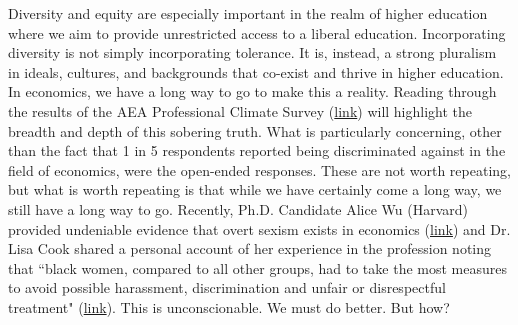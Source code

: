 \documentclass[12pt]{article}
\begin{document}
Diversity and equity are especially important in the realm of higher education where we aim to provide unrestricted access to a liberal education. Incorporating diversity is not simply incorporating tolerance. It is, instead, a strong pluralism in ideals, cultures, and backgrounds that co-exist and thrive in higher education. In economics, we have a long way to go to make this a reality. Reading through the results of the AEA Professional Climate Survey (\href{https://www.aeaweb.org/resources/member-docs/final-climate-survey-results-sept-2019}{link}) will highlight the breadth and depth of this sobering truth. What is particularly concerning, other than the fact that 1 in 5 respondents reported being discriminated against in the field of economics, were the open-ended responses. These are not worth repeating, but what is worth repeating is that while we have certainly come a long way, we still have a long way to go. Recently, Ph.D. Candidate Alice Wu (Harvard) provided undeniable evidence that overt sexism exists in economics (\href{https://www.aeaweb.org/articles?id=10.1257/pandp.20181101}{link}) and Dr. Lisa Cook shared a personal account of her experience in the profession noting that ``black women, compared to all other groups, had to take the most measures to avoid possible harassment, discrimination and unfair or disrespectful treatment" (\href{https://www.nytimes.com/2019/09/30/opinion/economics-black-women.html}{link}). This is unconscionable. We must do better. But how? 
\end{document}
